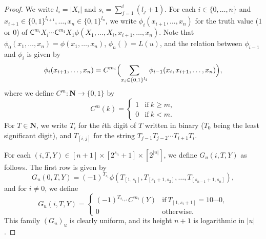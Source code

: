 \documentclass{lmcs}
\theoremstyle{definition}
\theoremstyle{remark}
\newcommand{\N}{\mathbf N}
\newcommand{\quantC}{\mathsf{C}}
\begin{document}
\begin{proof}
We write $l_i = |X_i|$ and $s_i = \sum^i_{j=1} (l _j + 1)$.
For each $i \in \{0, \dots, n\}$ and
$x _{i+1} \in \{0,1\}^{l_{i+1}}, \dots, x _n \in \{0,1\}^{l_n}$,
we write $\phi_i(x_{i+1}, \dots, x_n)$ for the truth value ($1$ or $0$) of $
\quantC^{m_{i}}{X_i} \cdots \quantC^{m_1}{X_1} \allowbreak 
\phi(X_1, \dots, X_i, x_{i+1}, \dots, x_n)
$.  Note that 
$\phi _0 (x _1, \ldots, x _n) = \phi (x _1, \ldots, x _n)$, 
$\phi _n () = L (u)$, 
and the relation between $\phi _{i - 1}$ and $\phi _i$ is given by 
\begin{equation}
\label{eq:phi-step}
   \phi _i (x _{i+1}, \dots, x_n) 
  = 
   C^{m_i} \Bigl( 
     \sum_{x_i \in \{ 0,1 \} ^{l_i}}
		\phi _{i - 1} (x _i, x_{i+1}, \dots, x_{n})
   \Bigr), 
\end{equation}
where we define $C ^m \colon \N \to \{0,1\}$ by 
\begin{equation}
 C ^m (k) 
  = \begin{cases}
     1 & \text{if} \ k \ge m, \\
     0 & \text{if} \ k < m.
    \end{cases}
\end{equation}
For $T \in \N$, we write $T_i$ for the 
$i$th digit of $T$ written in binary 
($T _0$ being the least significant digit),
and $T_{[i,j]}$ for the string $T_{j-1} T_{j-2} \cdots T_{i+1} T_{i}$.

For each $(i, T, Y) \in [n+1] \times [2^{s_n}+1] \times [2^{|u|}]$,
we define $G_u (i, T, Y)$ as follows.
The first row is given by
\begin{equation}
\label{eq:def-Gu:case0}
  G_u(0,T,Y) = 
   (-1)^{T_{s_1}}\phi(T_{[1,s_1]}, T_{[s_1+1,s_2]},
    \dots, T_{[s_{n-1}+1,s_n]}), 
\end{equation}
and for $i \neq 0$, we define 
\begin{equation} 
  G_u(i,T,Y) = 
   \begin{cases}
    (-1)^{T_{s_{i+1}}} C^{m_i}(Y) 
    & \text{if} \ T_{[1,s_i+1]} = 10 \cdots 0, \\
    0 & \text{otherwise}.
   \end{cases} 
   \label{eq:def-Gu:case-nonzero}
 \end{equation}
This family $(G_u)_u$ is clearly uniform, 
and its height $n + 1$ is logarithmic in $|u|$.


\end{proof}
\end{document}
